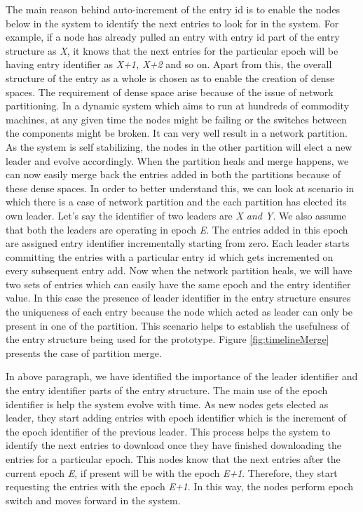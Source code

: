 \documentclass[12pt,a4paper,twoside,openright]{book}
\begin{document}
\par The main reason behind auto-increment of the entry id is to enable the nodes below in the system to identify the next entries to look for in the system. For example, if a node has already pulled an entry with entry id part of the entry structure as \textit{X}, it knows that the next entries for the particular epoch will be having entry identifier as \textit{X+1, X+2} and so on. Apart from this, the overall structure of the entry as a whole is chosen as to enable the creation of dense spaces. The requirement of dense space arise because of the issue of network partitioning. In a dynamic system which aims to run at hundreds of commodity machines, at any given time the nodes might be failing or the switches between the components might be broken. It can very well result in a network partition. As the system is self stabilizing, the nodes in the other partition will elect a new leader and evolve accordingly. When the partition heals and merge happens, we can now easily merge back the entries added in both the partitions because of these dense spaces. In order to better understand this, we can look at scenario in which there is a case of network partition and the each partition has elected its own leader. Let's say the identifier of two leaders are \textit{X and Y}. We also assume that both the leaders are operating in epoch \textit{E}. The entries added in this epoch are assigned entry identifier  incrementally starting from zero. Each leader starts committing the entries with a particular entry id which gets incremented on every subsequent entry add. Now when the network partition heals, we will have two sets of entries which can easily have the same epoch and the entry identifier value. In this case the presence of leader identifier in the entry structure ensures the uniqueness of each entry because the node which acted as leader can only be present in one of the partition. This scenario helps to establish the usefulness of the entry structure being used for the prototype. Figure \ref{fig:timelineMerge} presents the case of partition merge.

\par In above paragraph, we have identified the importance of the leader identifier and the entry identifier parts of the entry structure. The main use of the epoch identifier is help the system evolve with time. As new nodes gets elected as leader, they start adding entries with epoch identifier which is the increment of the epoch identifier of the previous leader. This process helps the system to identify the next entries to download once they have finished downloading the entries for a particular epoch. This nodes know that the next entries after the current epoch \textit{E}, if present will be with the epoch \textit{E+1}. Therefore, they start requesting the entries with the epoch \textit{E+1}. In this way, the nodes perform epoch switch and moves forward in the system.
\end{document}
